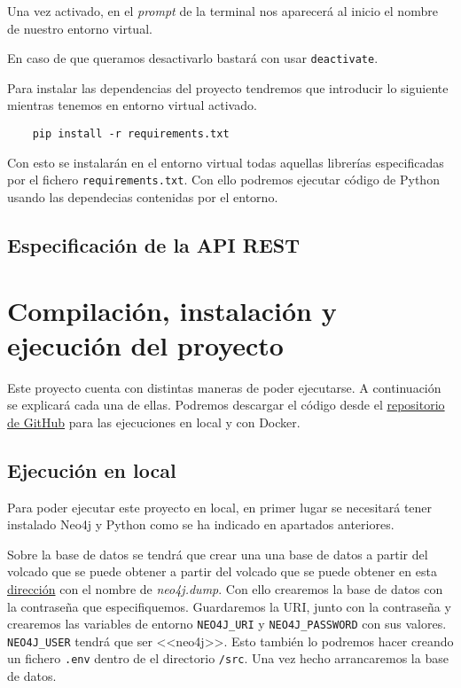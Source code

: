 Una vez activado, en el \textit{prompt} de la terminal nos aparecerá al inicio el nombre de nuestro entorno virtual.

En caso de que queramos desactivarlo bastará con usar \texttt{deactivate}.

Para instalar las dependencias del proyecto tendremos que introducir lo siguiente mientras tenemos en entorno virtual activado.

\begin{verbatim}
	pip install -r requirements.txt
\end{verbatim}

Con esto se instalarán en el entorno virtual todas aquellas librerías especificadas por el fichero \texttt{requirements.txt}. Con ello podremos ejecutar código de Python usando las dependecias contenidas por el entorno.
\subsection{Especificación de la API REST}

\label{sec:compilación}
\section{Compilación, instalación y ejecución del proyecto}
Este proyecto cuenta con distintas maneras de poder ejecutarse. A continuación se explicará cada una de ellas. Podremos descargar el código desde el \href{https://github.com/mariohu2001/TFG-Urban-Street-Mapping-Transfer}{repositorio de GitHub} para las ejecuciones en local y con Docker.
\subsection{Ejecución en local}
Para poder ejecutar este proyecto en local, en primer lugar se necesitará tener instalado Neo4j y Python como se ha indicado en apartados anteriores.

Sobre la base de datos se tendrá que crear una una base de datos a partir del volcado que se puede obtener a partir del volcado que se puede obtener en esta \href{https://universidaddeburgos-my.sharepoint.com/:f:/g/personal/mhu1001_alu_ubu_es/Evm-45Fq9y1Ps-F3_PGd5KsBNR3G0JAR2-t1IrXBDm2BEQ?e=rQP1ls}{dirección} con el nombre de \textit{neo4j.dump}. Con ello crearemos la base de datos con la contraseña que especifiquemos. Guardaremos la URI, junto con la contraseña y crearemos las variables de entorno \texttt{NEO4J\_URI} y \texttt{NEO4J\_PASSWORD} con sus valores. \texttt{NEO4J\_USER} tendrá que ser <<neo4j>>. Esto también lo podremos hacer creando un fichero \texttt{.env} dentro de el directorio \texttt{/src}. Una vez hecho arrancaremos la base de datos.

